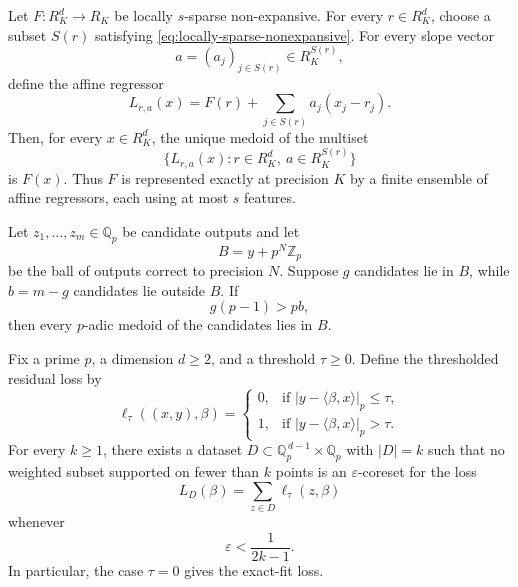 
\begin{thm}
\label{thm:sparse-medoid-representation}
Let \(F:R_K^d\to R_K\) be locally \(s\)-sparse non-expansive. For every
\(r\in R_K^d\), choose a subset \(S(r)\) satisfying
\eqref{eq:locally-sparse-nonexpansive}. For every slope vector
\[
a=(a_j)_{j\in S(r)}\in R_K^{S(r)},
\]
define the affine regressor
\[
L_{r,a}(x)
=
F(r)+\sum_{j\in S(r)}a_j(x_j-r_j).
\]
Then, for every \(x\in R_K^d\), the unique medoid of the multiset
\[
\{L_{r,a}(x): r\in R_K^d,\ a\in R_K^{S(r)}\}
\]
is \(F(x)\). Thus \(F\) is represented exactly at precision \(K\) by a finite
ensemble of affine regressors, each using at most \(s\) features.
\end{thm}

\begin{proposition}
\label{prop:medoid-robustness}
Let \(z_1,\ldots,z_m\in\mathbb{Q}_p\) be candidate outputs and let
\[
B=y+p^N\mathbb{Z}_p
\]
be the ball of outputs correct to precision \(N\). Suppose \(g\) candidates lie
in \(B\), while \(b=m-g\) candidates lie outside \(B\). If
\[
g(p-1)>pb,
\]
then every \(p\)-adic medoid of the candidates lies in \(B\).
\end{proposition}

\begin{thm}
\label{thm:threshold-coreset}
Fix a prime $p$, a dimension $d\ge 2$, and a threshold $\tau\ge 0$. Define the
thresholded residual loss by
\[
\ell_\tau((x,y),\beta)=
\begin{cases}
0, & \text{if } |y-\langle \beta,x\rangle|_p \le \tau,\\
1, & \text{if } |y-\langle \beta,x\rangle|_p > \tau.
\end{cases}
\]
For every $k\ge 1$, there exists a dataset
$D\subset \mathbb{Q}_p^{\,d-1}\times \mathbb{Q}_p$ with $|D|=k$ such that no
weighted subset supported on fewer than $k$ points is an $\varepsilon$-coreset
for the loss
\[
L_D(\beta)=\sum_{z\in D}\ell_\tau(z,\beta)
\]
whenever
\[
\varepsilon<\frac{1}{2k-1}.
\]
In particular, the case $\tau=0$ gives the exact-fit loss.
\end{thm}

